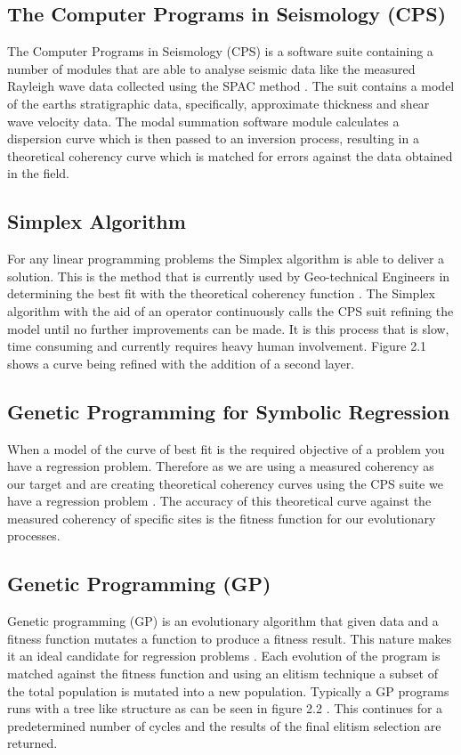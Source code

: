 \subsection{The Computer Programs in Seismology (CPS)}
The Computer Programs in Seismology (CPS) is a software suite containing a number of modules that are able to analyse seismic data like the measured Rayleigh wave data collected using the SPAC method \cite{11}. The suit contains a model of the earths stratigraphic data, specifically, approximate thickness and shear wave velocity data. The modal summation software module calculates a dispersion curve which is then passed to an inversion process, resulting in a theoretical coherency curve which is matched for errors against the data obtained in the field.



\subsection{Simplex Algorithm}
For any linear programming problems the Simplex algorithm is able to deliver a solution. This is the method that is currently used by Geo-technical Engineers in determining the best fit with the theoretical coherency function \cite{2}. The Simplex algorithm with the aid of an operator continuously calls the CPS suit refining the model until no further improvements can be made. It is this process that is slow, time consuming and currently requires heavy human involvement. Figure 2.1 shows a curve being refined with the addition of a second layer.



\subsection{Genetic Programming for Symbolic Regression}
When a model of the curve of best fit is the required objective of a problem you have a regression problem. Therefore as we are using a measured coherency as our target and are creating theoretical coherency curves using the CPS suite we have a regression problem \cite{13} \cite{scoble1}. The accuracy of this theoretical curve against the measured coherency of specific sites is the fitness function for our evolutionary processes.


\subsection{Genetic Programming (GP)}
Genetic programming (GP) is an evolutionary algorithm that given data and a fitness function mutates a function to produce a fitness result. This nature makes it an ideal candidate for regression problems \cite{poli1} \cite{scoble1}. Each evolution of the program is matched against the fitness function and using an elitism technique a subset of the total population is mutated into a new population. Typically a GP programs runs with a tree like structure as can be seen in figure 2.2 \cite{13}. This continues for a predetermined number of cycles and the results of the final elitism selection are returned.

